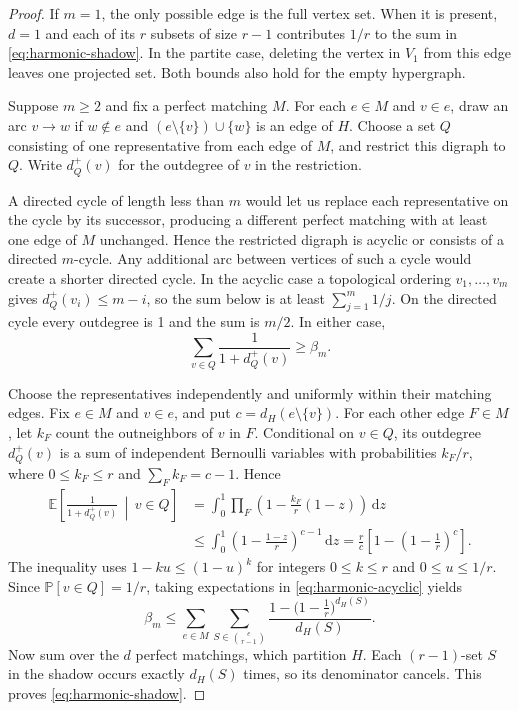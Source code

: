 \documentclass[10pt]{article}
\numberwithin{equation}{section}
\theoremstyle{definition}
\begin{document}
\begin{proof}
If $m=1$, the only possible edge is the full vertex set. When it is present, $d=1$ and each of its $r$ subsets of size $r-1$ contributes $1/r$ to the sum in \cref{eq:harmonic-shadow}. In the partite case, deleting the vertex in $V_1$ from this edge leaves one projected set. Both bounds also hold for the empty hypergraph.

Suppose $m\ge2$ and fix a perfect matching $M$. For each $e\in M$ and $v\in e$, draw an arc $v\to w$ if $w\notin e$ and $(e\setminus\{v\})\cup\{w\}$ is an edge of $H$. Choose a set $Q$ consisting of one representative from each edge of $M$, and restrict this digraph to $Q$. Write $d_Q^+(v)$ for the outdegree of $v$ in the restriction.

A directed cycle of length less than $m$ would let us replace each representative on the cycle by its successor, producing a different perfect matching with at least one edge of $M$ unchanged. Hence the restricted digraph is acyclic or consists of a directed $m$-cycle. Any additional arc between vertices of such a cycle would create a shorter directed cycle. In the acyclic case a topological ordering $v_1,\ldots,v_m$ gives $d_Q^+(v_i)\le m-i$, so the sum below is at least $\sum_{j=1}^m 1/j$. On the directed cycle every outdegree is 1 and the sum is $m/2$. In either case,
\begin{equation}
 \sum_{v\in Q}\frac1{1+d_Q^+(v)}\ge\beta_m.
 \label{eq:harmonic-acyclic}
\end{equation}

Choose the representatives independently and uniformly within their matching edges. Fix $e\in M$ and $v\in e$, and put $c=d_H(e\setminus\{v\})$. For each other edge $F\in M$, let $k_F$ count the outneighbors of $v$ in $F$. Conditional on $v\in Q$, its outdegree $d_Q^+(v)$ is a sum of independent Bernoulli variables with probabilities $k_F/r$, where $0\le k_F\le r$ and $\sum_F k_F=c-1$. Hence
\begin{align*}
 \mathbb E\!\left[\frac1{1+d_Q^+(v)}\,\middle|\,v\in Q\right]
 &=\int_0^1\prod_F\left(1-\frac{k_F}{r}(1-z)\right)\,\mathrm dz\\
 &\le\int_0^1\left(1-\frac{1-z}{r}\right)^{c-1}\,\mathrm dz
 =\frac r c\left[1-\left(1-\frac1r\right)^c\right].
\end{align*}
The inequality uses $1-ku\le(1-u)^k$ for integers $0\le k\le r$ and $0\le u\le1/r$. Since $\mathbb P[v\in Q]=1/r$, taking expectations in \cref{eq:harmonic-acyclic} yields
\[
 \beta_m\le\sum_{e\in M}\sum_{S\in\binom e{r-1}}
 \frac{1-\bigl(1-\tfrac1r\bigr)^{d_H(S)}}{d_H(S)}.
\]
Now sum over the $d$ perfect matchings, which partition $H$. Each $(r-1)$-set $S$ in the shadow occurs exactly $d_H(S)$ times, so its denominator cancels. This proves \cref{eq:harmonic-shadow}.


\end{proof}
\end{document}
